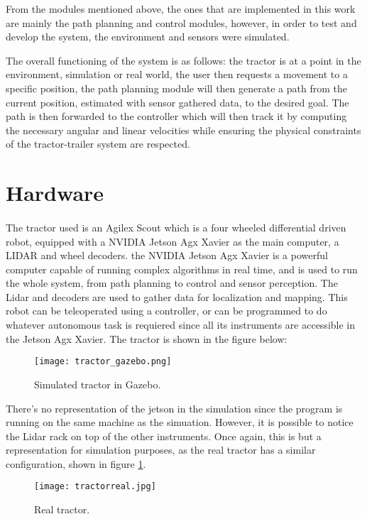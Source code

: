 From the modules mentioned above, the ones that are implemented in this work are mainly 
the path planning and control modules, however, in order to test and develop the system, 
the environment and sensors were simulated.

The overall functioning of the system is as follows: the tractor is at a point in the environment, simulation or real world, 
the user then requests a movement to a specific position, the path planning module will then generate a path from the current 
position, estimated with sensor gathered data, to the desired goal. The path is then forwarded to the 
controller which will then track it by computing the necessary angular and linear velocities while ensuring the 
physical constraints of the tractor-trailer system are respected.
 


\section{Hardware}
\label{sec:hardware}

\paragraph{}The tractor used is an Agilex Scout which is a four wheeled differential driven robot, 
equipped with a NVIDIA Jetson Agx Xavier as the main computer, a LIDAR and wheel decoders. 
the NVIDIA Jetson Agx Xavier is a powerful computer capable of running complex algorithms in real time, 
and is used to run the whole system, from path planning to control and sensor 
perception. The Lidar and decoders are used to gather data for localization and mapping. This 
robot can be teleoperated using a controller, or can be programmed 
to do whatever autonomous task is requiered since all its instruments 
are accessible in the Jetson Agx Xavier. The tractor is shown in the figure below:

\begin{figure}[h]
    \centering
    \texttt{[image: tractor\_gazebo.png]}
    \caption{Simulated tractor in Gazebo.}
\end{figure}

There's no representation of the jetson in the simulation since the program is running on 
the same machine as the simuation. However, it is possible to 
notice the Lidar rack on top of the other instruments. Once again, this is 
but a representation for simulation purposes, as the real tractor has a similar 
configuration, shown in figure \ref{fig:tractor}.
\begin{figure}[h]
    \centering
    \texttt{[image: tractorreal.jpg]}
    \caption{Real tractor.}
    \label{fig:tractor}
\end{figure}

